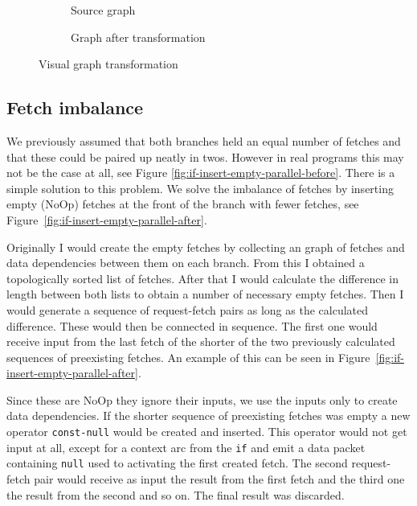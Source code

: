 \begin{figure}[h]
  \begin{subfigure}[b]{0.65\textwidth}
    \caption{Source graph}
    \label{fig:if-trans-before}
  \end{subfigure}

  \begin{subfigure}[b]{.35\textwidth}
  \end{subfigure}

  \begin{subfigure}{\textwidth}
      \caption{Graph after transformation}
      \label{fig:if-trans-merged}
  \end{subfigure}
  \caption{Visual graph transformation}
\end{figure}

\subsection{Fetch imbalance}

We previously assumed that both branches held an equal number of fetches and that these could be paired up neatly in twos.
However in real programs this may not be the case at all, see Figure \ref{fig:if-insert-empty-parallel-before}.
There is a simple solution to this problem.
We solve the imbalance of fetches by inserting empty (NoOp) fetches at the front of the branch with fewer fetches, see Figure~\ref{fig:if-insert-empty-parallel-after}.

Originally I would create the empty fetches by collecting an graph of fetches and data dependencies between them on each branch.
From this I obtained a topologically sorted list of fetches.
After that I would calculate the difference in length between both lists to obtain a number of necessary empty fetches.
Then I would generate a sequence of request-fetch pairs as long as the calculated difference.
These would then be connected in sequence.
The first one would receive input from the last fetch of the shorter of the two previously calculated sequences of preexisting fetches.
An example of this can be seen in Figure~\ref{fig:if-insert-empty-parallel-after}.

Since these are NoOp they ignore their inputs, we use the inputs only to create data dependencies.
If the shorter sequence of preexisting fetches was empty a new operator \texttt{const-null} would be created and inserted.
This operator would not get input at all, except for a context arc from the \texttt{if} and emit a data packet containing \texttt{null} used to activating the first created fetch.
The second request-fetch pair would receive as input the result from the first fetch and the third one the result from the second and so on.
The final result was discarded.


